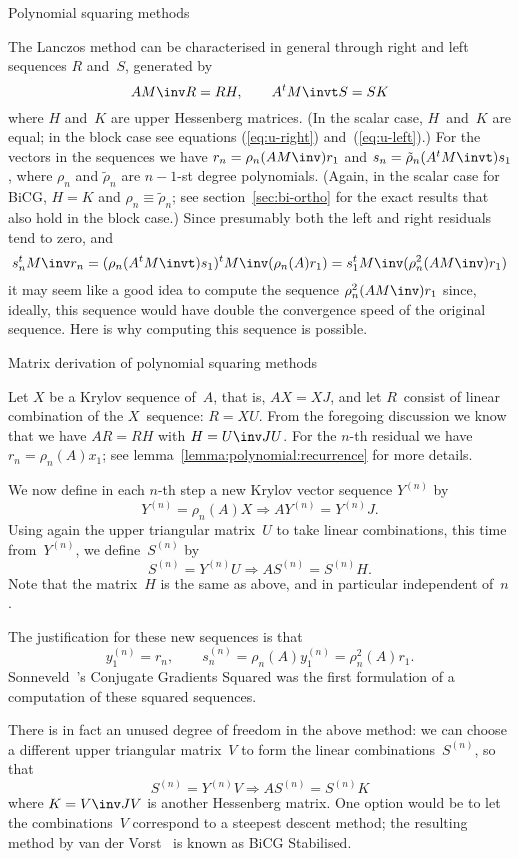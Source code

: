  {Polynomial squaring methods}
\label{sec:cgs}

The Lanczos method can be characterised in general
through right and left sequences $R$ and~$S$, generated by
\[ AM\inv R=RH,\qquad A^tM\invt S=SK \]
where $H$ and~$K$ are upper Hessenberg matrices.
(In the scalar case, $H$~and~$K$ are equal; in the block case
see equations (\ref{eq:u-right}) and~(\ref{eq:u-left}).)
For the vectors in the sequences we have
$r_n=\rho_n(AM\inv)r_1$ and $s_n=\tilde\rho_n(A^tM\invt)s_1$,
where $\rho_n$ and $\tilde\rho_n$ are $n-1$-st degree polynomials.
(Again, in the scalar case for BiCG, $H=K$ 
and $\rho_n\equiv\tilde\rho_n$; see section~\ref{sec:bi-ortho}
for the exact results that also hold in the block case.)
Since presumably both the left and right residuals tend to zero, and
\[ s_n^tM\inv r_n = (\rho_n(A^tM\invt)s_1)^tM\inv(\rho_n(A)r_1)
 = s_1^tM\inv(\rho^2_n(AM\inv)r_1) \]
it may seem like a good idea to compute the sequence
$\rho^2_n(AM\inv)r_1$ since, ideally, this sequence would have double the
convergence speed of the original sequence. Here is why computing this
sequence  is possible.

 {Matrix derivation of polynomial squaring methods}

Let $X$ be a Krylov sequence of~$A$, that is, $AX=XJ$, and let
$R$~consist of linear combination of the $X$~sequence: $R=XU$. From
the foregoing discussion we know that we have $AR=RH$ with $H=U\inv JU$.
For the $n$-th residual we have $r_n=\rho_n(A)x_1$;
see lemma~\ref{lemma:polynomial:recurrence} for more details.

We now define in each $n$-th step a new Krylov vector sequence $Y^{(n)}$
by \[ Y^{(n)}=\rho_n(A)X \Rightarrow AY^{(n)}=Y^{(n)}J. \]
Using again the upper triangular matrix~$U$ to take linear
combinations, this time from~$Y^{(n)}$, we define~$S^{(n)}$ by
\begin{equation}
	S^{(n)}=Y^{(n)}U \Rightarrow AS^{(n)}=S^{(n)}H. 
	\label{cgs:SH:relation}\end{equation}
Note that the matrix~$H$ is the same as above, and in particular
independent of~$n$.

The justification for these new sequences is that
\[ y^{(n)}_1=r_n,\qquad s^{(n)}_n=\rho_n(A)y^{(n)}_1=\rho^2_n(A)r_1. \]
Sonneveld~\cite{Sonneveld1989:cgs}'s Conjugate Gradients Squared
was the first formulation of a computation of these squared sequences.

There is in fact an unused degree of freedom in the above method: we
can choose a different upper triangular matrix~$V$ to form the linear
combinations~$S^{(n)}$, so that
\begin{equation} S^{(n)}=Y^{(n)}V \Rightarrow AS^{(n)}=S^{(n)}K
    \label{eq:cgs-mat}\end{equation}
where $K=V\inv JV$ is another Hessenberg matrix.
One option would be to let the combinations~$V$
correspond to a steepest descent method;
the resulting method by van der Vorst~\cite{vdVorst1992:bicgstab}
is known as BiCG Stabilised.

